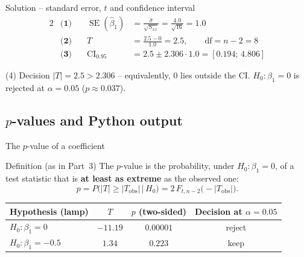 \documentclass[aspectratio=169,11pt]{beamer}
\begin{document}
\begin{frame}{Solution -- standard error, $t$ and confidence interval}
  \begin{alignat*}{2}
    &\textbf{(1)}\quad & \operatorname{SE}(\hat\beta_1)&=\frac{\hat\sigma}{\sqrt{S_{xx}}}
      =\frac{4.0}{\sqrt{16}}=\mathbf{1.0}\\[2pt]
    &\textbf{(2)}\quad & T&=\frac{2.5-0}{1.0}=\mathbf{2.5},\qquad \text{df}=n-2=8\\[2pt]
    &\textbf{(3)}\quad & \text{CI}_{0.95}&=2.5\pm2.306\cdot1.0=\mathbf{[0.194;\,4.806]}
  \end{alignat*}
  \begin{exampleblock}{(4) Decision}
    $|T|=2.5>2.306$ -- equivalently, $0$ lies outside the CI. $H_0:\beta_1=0$
    is rejected at $\alpha=0.05$ ($p\approx0.037$).
  \end{exampleblock}
\end{frame}

\subsection{\texorpdfstring{$p$}{p}-values and Python output}

\begin{frame}{The $p$-value of a coefficient}
  \begin{block}{Definition (as in Part~3)}
    The $p$-value is the probability, under $H_0:\beta_1=0$, of a test
    statistic that is \textbf{at least as extreme} as the observed one:
    \[
      p=P\bigl(|T|\ge|T_{\text{obs}}|\,\big|\,H_0\bigr)=2\,F_{t,n-2}\bigl(-|T_{\text{obs}}|\bigr).
    \]
  \end{block}
  \begin{center}
    \renewcommand{\arraystretch}{1.25}
    \begin{tabular}{lccc}
      \toprule
      Hypothesis (lamp) & $T$ & $p$ (two-sided) & Decision at $\alpha=0.05$\\
      \midrule
      $H_0:\beta_1=0$ & $-11.19$ & $0.00001$ & reject\\
      $H_0:\beta_1=-0.5$ & $1.34$ & $0.223$ & keep\\
      \bottomrule
    \end{tabular}
  \end{center}
\end{frame}
\end{document}
